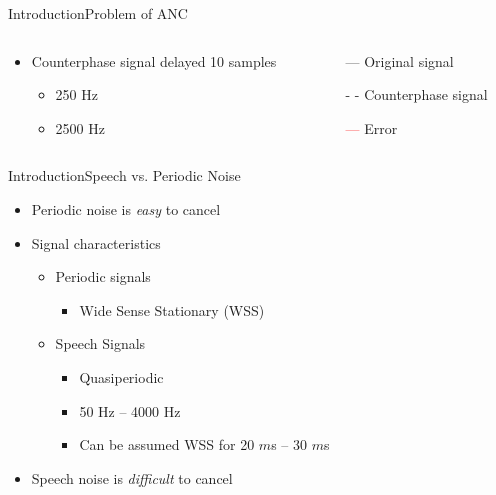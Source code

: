 \begin{frame}{Introduction}{Problem of ANC}		
	\begin{columns}
		\begin{column}{0.5\textwidth}
			\begin{itemize}
				\item Counterphase signal delayed 10 samples	
				\begin{itemize}
					\item 250 Hz
					\item 2500 Hz 
				\end{itemize}	
			\end{itemize}
			\vspace{-6.5mm}			
		\begin{center}
	 		
	 	\end{center}
		\end{column}
		\begin{column}{0.5\textwidth} 
		\begin{itemize}
			\item[\textcolor{MATLABblue}{---}] Original signal
			\item[\textcolor{MATLABblue}{- -}] Counterphase signal
			\item[\textcolor{red}{---}] Error
		\end{itemize}
		\begin{center}
	 		
	 	\end{center}
		\end{column}
	\end{columns}
\end{frame}





\begin{frame}{Introduction}{Speech vs. Periodic Noise}		
	\begin{itemize}
		\item Periodic noise is \textit{easy} to cancel
		\item Signal characteristics
		\begin{itemize}
			\item Periodic signals
			\begin{itemize}
				\item Wide Sense Stationary (WSS)
			\end{itemize}
			\item Speech Signals
			\begin{itemize}
				\item Quasiperiodic
				\item 50 Hz -- 4000 Hz
				\item Can be assumed WSS for 20 $m$s -- 30 $m$s 
			\end{itemize}
		\end{itemize}
		\item Speech noise is \textit{difficult} to cancel
	\end{itemize}
\end{frame}




